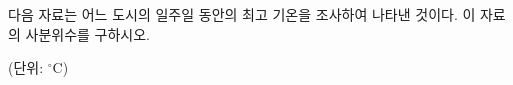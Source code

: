 다음 자료는 어느 도시의 일주일 동안의 최고 기온을 조사하여 나타낸 것이다. 이 자료의 사분위수를 구하시오. \par{\raggedleft\small (단위: ${}^\circ\mathrm{C}$)\par}
